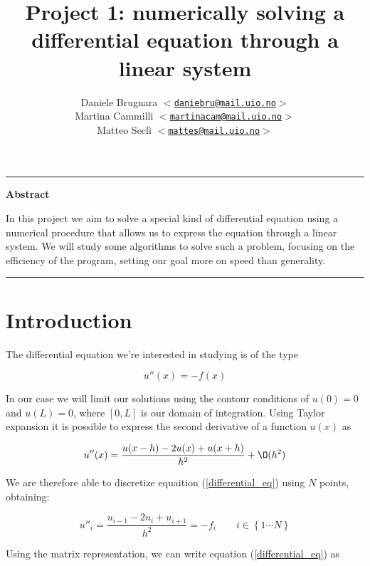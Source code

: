 \documentclass {article}
\author{
\normalsize Daniele Brugnara \texttt{$<$\href{mailto:daniebru@mail.uio.no}
{daniebru@mail.uio.no}$>$}\\
\normalsize Martina Cammilli \texttt{$<$\href{mailto:martinacam@mail.uio.no}
{martinacam@mail.uio.no}$>$}\\
\normalsize Matteo Seclì \texttt{$<$\href{mailto:mattes@mail.uio.no}
{mattes@mail.uio.no}$>$}
}
\title{\textbf{Project 1: numerically solving a differential equation through a linear system}}
\begin{document}
\maketitle

\hrule
\begin{center}
	\large\textbf{Abstract}
	\medskip\\
	\begin{minipage}[c][][c]{0.8\textwidth}
		\small{
			In this project we aim to solve a special kind of differential equation using a numerical procedure that allows us to express the equation through a linear system. We will study some algorithms to solve such a problem, focusing on the efficiency of the program, setting our goal more on speed than generality.
			}
	\end{minipage}
\end{center}
\medskip
\hrule

\section{Introduction}

The differential equation we're interested in studying is of the type

\begin{equation}
	u''(x)= - f(x)
	\label{differential_eq}
\end{equation}

In our case we will limit our solutions using the contour conditions of $u(0)=0$ and $u(L)=0$, where $[0, L]$ is our domain of integration.
Using Taylor expansion it is possible to express the second derivative of a function $u(x)$ as

\begin{equation}
	u''(x)= \frac{u(x-h)-2 u(x)+u(x+h)}{h^2}+ \O (h^2)
\end{equation}

We are therefore able to discretize equaition (\ref{differential_eq}) using $N$ points, obtaining:

$$u''_i= \frac{u_{i-1}-2 u_i+u_{i+1}}{h^2}=-f_i \quad \quad i \in \left\lbrace 1 \cdots N\right\rbrace$$

Using the matrix representation, we can write equation (\ref{differential_eq}) as
\end{document}
